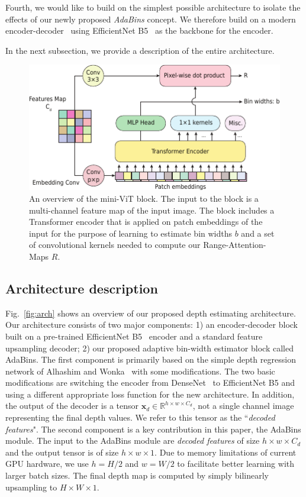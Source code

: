 \documentclass[final]{cvpr}
\begin{document}
Fourth, we would like to build on the simplest possible architecture to isolate the effects of our newly proposed \emph{AdaBins} concept. We therefore build on a modern encoder-decoder~\cite{Alhashim2018} using EfficientNet B5~\cite{efficentnet_TanL19} as the backbone for the encoder.

In the next subsection, we provide a description of the entire architecture.

\begin{figure}[t]
\centering
   \includegraphics[width=\linewidth]{mViT_v6.pdf}
   \caption{An overview of the mini-ViT block. The input to the block is a multi-channel feature map of the input image. The block includes a Transformer encoder that is applied on patch embeddings of the input for the purpose of learning to estimate bin widths $b$ and a set of convolutional kernels needed to compute our Range-Attention-Maps $R$.}
\label{fig:mVit-module}
\end{figure}

\subsection{Architecture description}
%
Fig.~\ref{fig:arch} shows an overview of our proposed depth estimating architecture. Our architecture consists of two major components: 1) an encoder-decoder block built on a pre-trained EfficientNet B5~\cite{efficentnet_TanL19} encoder and a standard feature upsampling decoder; 2) our proposed adaptive bin-width estimator block called AdaBins.
%
The first component is primarily based on the simple depth regression network of Alhashim and Wonka~\cite{Alhashim2018} with some modifications. The two basic modifications are switching the encoder from DenseNet~\cite{huang2017densely} to EfficientNet B5 and using a different appropriate loss function for the new architecture. In addition, the output of the decoder is a tensor $\textbf{x}_d \in \mathbb{R}^{h \times w \times C_d}$, not a single channel image representing the final depth values. We refer to this tensor as the ``\textit{decoded features}". 
%
The second component is a key contribution in this paper, the AdaBins module. The input to the AdaBins module are \textit{decoded features} of size $h \times w \times C_d$ and the output tensor is of size $h \times w \times 1$.
Due to memory limitations of current GPU hardware, we use $h=H/2$ and $w=W/2$ to facilitate better learning with larger batch sizes. The final depth map is computed by simply bilinearly upsampling to $H\times W\times 1$. 
\end{document}
